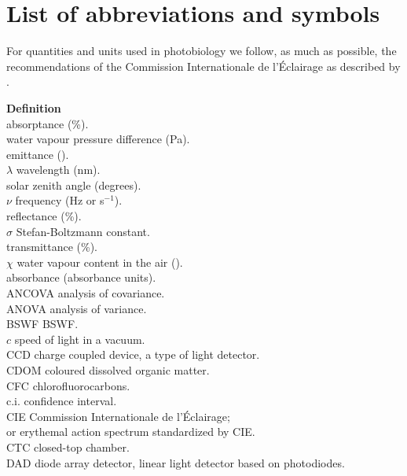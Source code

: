 
\chapter{List of abbreviations and symbols}

For quantities and units used in photobiology we follow, as much as possible, the recommendations of the Commission Internationale de l'Éclairage as described by \autocite{Sliney2007}.
\begin{tabbing}
 \= \textbf{Definition} \\[1ex]
\abst  \> \gls{absorptance} (\%).\\
\deltae \> water vapour pressure difference (Pa).\\
\emitt \> emittance (\watt).\\
$\lambda$ \>  wavelength (nm).\\
\SZA   \> solar zenith angle (degrees).\\
$\nu$ \> frequency (Hz or s$^{-1}$).\\
  \> \gls{reflectance} (\%).\\
$\sigma$ \> Stefan-Boltzmann constant.\\
\trans \> \gls{transmittance} (\%).\\
$\chi$ \> water vapour content in the air (\gmcubic).\\
\absb  \> \gls{absorbance} (absorbance units).\\
ANCOVA \> analysis of covariance.\\
ANOVA \> analysis of variance.\\
BSWF \> \gls{BSWF}.\\
$c$ \> speed of light in a vacuum.\\
CCD \> charge coupled device, a type of light detector.\\
CDOM \> coloured dissolved organic matter.\\
CFC \> chlorofluorocarbons.\\
c.i.\> confidence interval.\\
CIE \>  Commission Internationale de l'Éclairage;\\%
    \>  or erythemal action spectrum standardized by CIE.\\
CTC \> closed-top chamber.\\
DAD \> diode array detector, linear light detector based on photodiodes.\\

\end{tabbing}
